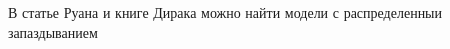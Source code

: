 \documentclass[12pt]{article}
\begin{document}
В статье Руана \cite{Ruan}  и книге Дирака \cite{dirac} можно найти модели с распределенныи запаздыванием
\printbibliography
\end{document}

